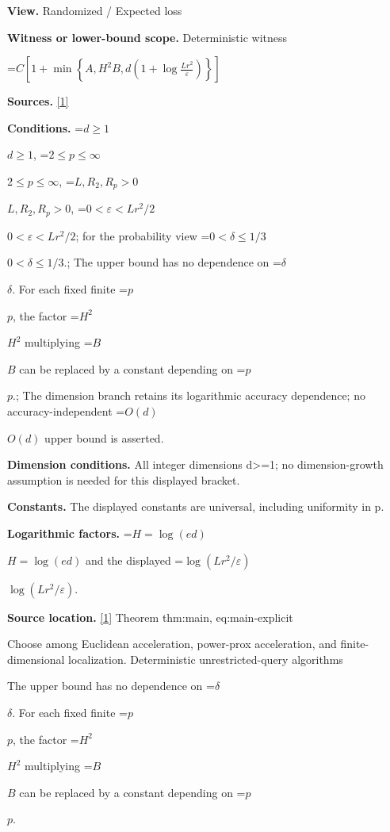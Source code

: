 \documentclass[10pt,a4paper]{article}
\newcommand{\AtlasMath}[1]{\par\begingroup\centering\setbox0=\hbox{$\displaystyle #1$}\ifdim\wd0>1.4\linewidth\typeout{ATLAS WIDE FORMULA: \the\wd0}\fi\ifdim\wd0>\linewidth\resizebox{\linewidth}{!}{\box0}\else\box0\fi\par\endgroup}
\newcommand{\AtlasInlineMath}[1]{\begingroup\setbox0=\hbox{$#1$}\ifdim\wd0>.4\linewidth\endgroup\AtlasMath{#1}\else\endgroup$#1$\fi}
\begin{document}
\textbf{View.} Randomized / Expected loss



\textbf{Witness or lower-bound scope.} Deterministic witness



\AtlasMath{C\left[1+\min\left\{A,H^2B,d\left(1+\log\frac{Lr^2}{\varepsilon}\right)\right\}\right]}


\textbf{Sources.} \href{https://github.com/WU-Wendao/Colombo/blob/main/colombo_sensorium/Complexity_altas/data/sources/colombo/U02/manuscript.pdf}{[1]}



\textbf{Conditions.} \AtlasInlineMath{d\ge1}, \AtlasInlineMath{2\le p\le\infty}, \AtlasInlineMath{L,R_2,R_p>0}, \AtlasInlineMath{0<\varepsilon<Lr^2/2}; for the probability view \AtlasInlineMath{0<\delta\le1/3}.; The upper bound has no dependence on \AtlasInlineMath{\delta}. For each fixed finite \AtlasInlineMath{p}, the factor \AtlasInlineMath{H^2} multiplying \AtlasInlineMath{B} can be replaced by a constant depending on \AtlasInlineMath{p}.; The dimension branch retains its logarithmic accuracy dependence; no accuracy-independent \AtlasInlineMath{O(d)} upper bound is asserted.



\textbf{Dimension conditions.} All integer dimensions d>=1; no dimension-growth assumption is needed for this displayed bracket.



\textbf{Constants.} The displayed constants are universal, including uniformity in p.



\textbf{Logarithmic factors.} \AtlasInlineMath{H=\log(ed)} and the displayed \AtlasInlineMath{\log(Lr^2/\varepsilon)}.



\textbf{Source location.} \href{https://github.com/WU-Wendao/Colombo/blob/main/colombo_sensorium/Complexity_altas/data/sources/colombo/U02/manuscript.pdf}{[1]} Theorem thm:main, eq:main-explicit



Choose among Euclidean acceleration, power-prox acceleration, and finite-dimensional localization. Deterministic unrestricted-query algorithms



The upper bound has no dependence on \AtlasInlineMath{\delta}. For each fixed finite \AtlasInlineMath{p}, the factor \AtlasInlineMath{H^2} multiplying \AtlasInlineMath{B} can be replaced by a constant depending on \AtlasInlineMath{p}.
\end{document}
